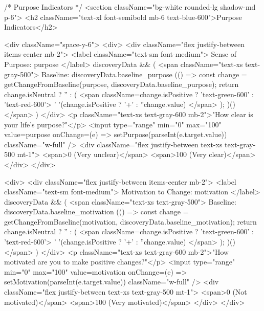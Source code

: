{        {/* Purpose Indicators */}
        <section className="bg-white rounded-lg shadow-md p-6">
          <h2 className="text-xl font-semibold mb-6 text-blue-600">Purpose Indicators</h2>
          
          <div className="space-y-6">
            <div>
              <div className="flex justify-between items-center mb-2">
                <label className="text-sm font-medium">
                  Sense of Purpose: {purpose}
                </label>
                {discoveryData && (
                  <span className="text-xs text-gray-500">
                    Baseline: {discoveryData.baseline_purpose}
                    {(() => {
                      const change = getChangeFromBaseline(purpose, discoveryData.baseline_purpose);
                      return change.isNeutral ? '' : (
                        <span className={change.isPositive ? 'text-green-600' : 'text-red-600'}>
                          {' '}({change.isPositive ? '+' : ''}{change.value})
                        </span>
                      );
                    })()}
                  </span>
                )}
              </div>
              <p className="text-xs text-gray-600 mb-2">"How clear is your life's purpose?"</p>
              <input
                type="range"
                min="0"
                max="100"
                value={purpose}
                onChange={(e) => setPurpose(parseInt(e.target.value))}
                className="w-full"
              />
              <div className="flex justify-between text-xs text-gray-500 mt-1">
                <span>0 (Very unclear)</span>
                <span>100 (Very clear)</span>
              </div>
            </div>

            <div>
              <div className="flex justify-between items-center mb-2">
                <label className="text-sm font-medium">
                  Motivation to Change: {motivation}
                </label>
                {discoveryData && (
                  <span className="text-xs text-gray-500">
                    Baseline: {discoveryData.baseline_motivation}
                    {(() => {
                      const change = getChangeFromBaseline(motivation, discoveryData.baseline_motivation);
                      return change.isNeutral ? '' : (
                        <span className={change.isPositive ? 'text-green-600' : 'text-red-600'}>
                          {' '}({change.isPositive ? '+' : ''}{change.value})
                        </span>
                      );
                    })()}
                  </span>
                )}
              </div>
              <p className="text-xs text-gray-600 mb-2">"How motivated are you to make positive changes?"</p>
              <input
                type="range"
                min="0"
                max="100"
                value={motivation}
                onChange={(e) => setMotivation(parseInt(e.target.value))}
                className="w-full"
              />
              <div className="flex justify-between text-xs text-gray-500 mt-1">
                <span>0 (Not motivated)</span>
                <span>100 (Very motivated)</span>
              </div>
            </div>

}
